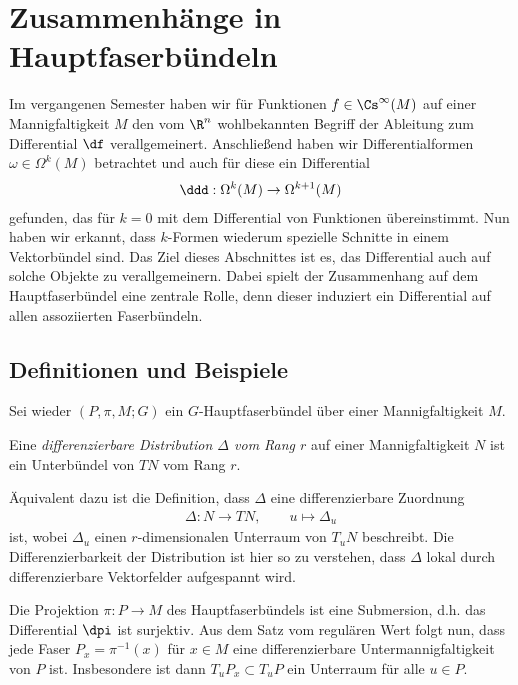 \documentclass[%
	paper=a5,%
	fleqn,%
	DIV=18,%
	BCOR=0mm,
	fontsize=11pt,
	titlepage=false,%
	bibliography=totoc,
	DIV=18,%
	twoside=true,
	pdftitle=Riemannsche Geometrie,
	pdfauthor=Uwe Semmelmann,
	numbers=noendperiod]%
	{scrbook}
\begin{document}

\chapter{Zusammenhänge in Hauptfaserbündeln}

Im vergangenen Semester haben wir für Funktionen $f\in\Cs^\infty(M)$ auf einer
Mannigfaltigkeit $M$ den vom $\R^n$ wohlbekannten Begriff der Ableitung zum
Differential $\df$ verallgemeinert. Anschließend haben wir
Differentialformen $\omega\in\Omega^k(M)$ betrachtet und auch für diese ein
Differential
\begin{align*}
\ddd : \Omega^k(M)\to \Omega^{k+1}(M)
\end{align*}
gefunden, das für $k=0$ mit dem Differential von Funktionen übereinstimmt. Nun
haben wir erkannt, dass $k$-Formen wiederum spezielle Schnitte in einem
Vektorbündel sind. Das Ziel dieses Abschnittes ist es, das Differential auch auf
solche Objekte zu verallgemeinern. Dabei spielt der Zusammenhang auf dem
Hauptfaserbündel eine zentrale Rolle, denn dieser induziert ein
Differential auf allen assoziierten Faserbündeln. 

\section{Definitionen und Beispiele}

Sei wieder $(P,\pi,M;G)$ ein $G$-Hauptfaserbündel über einer Mannigfaltigkeit
$M$.

\begin{defn}
\label{defn:Distribution}
Eine \emph{differenzierbare Distribution $\Delta$ vom Rang $r$} auf einer
Mannigfaltigkeit $N$ ist ein Unterbündel von $TN$ vom Rang $r$.\fish
\end{defn} 

\begin{rem}
Äquivalent dazu ist die Definition, dass $\Delta$ eine differenzierbare
Zuordnung
\begin{align*}
\Delta : N\to TN,\qquad u\mapsto \Delta_u
\end{align*}
ist, wobei $\Delta_u$ einen $r$-dimensionalen Unterraum von $T_uN$ beschreibt.
Die Differenzierbarkeit der Distribution ist hier so zu verstehen, dass $\Delta$
lokal durch differenzierbare Vektorfelder aufgespannt wird.\map
\end{rem}

Die Projektion $\pi\colon P\to M$ des Hauptfaserbündels ist eine Submersion, d.h. das
Differential $\dpi$ ist surjektiv. Aus dem Satz vom regulären Wert folgt nun,
dass jede Faser $P_x = \pi^{-1}(x)$ für $x\in M$ eine differenzierbare
Untermannigfaltigkeit von $P$ ist. Insbesondere ist dann $T_uP_x\subset T_uP$
ein Unterraum für alle $u\in P$.
\end{document}
